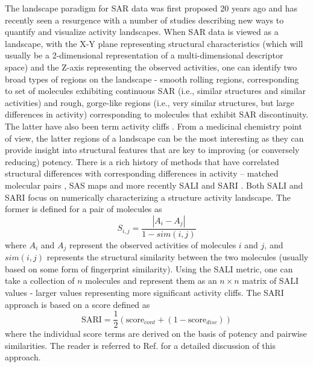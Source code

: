 \documentclass[letterpaper, 12pt]{article}
\begin{document}
The landscape paradigm for SAR data was first proposed 20 years ago \cite{Johnson:1990ys} and has
recently seen a resurgence with a number of studies describing new ways to quantify and visualize
activity landscapes. When SAR data is viewed as a landscape, with the X-Y plane representing
structural characteristics (which will usually be a 2-dimensional representation of a
multi-dimensional descriptor space) and the Z-axis representing the observed activities, one can
identify two broad types of regions on the landscape - smooth rolling regions, corresponding to set
of molecules exhibiting continuous SAR (i.e., similar structures and similar activities) and rough,
gorge-like regions (i.e., very similar structures, but large differences in activity) corresponding
to molecules that exhibit SAR discontinuity. The latter have also been term activity cliffs
\cite{Maggiora:2006aa}. From a medicinal chemistry point of view, the latter regions of a landscape
can be the most interesting as they can provide insight into structural features that are key to
improving (or conversely reducing) potency. There is a rich history of methods that have correlated
structural differences with corresponding differences in activity -- matched molecular pairs
\cite{Leach:2006aa}, SAS maps \cite{Maggiora:2011kx} and more recently SALI \cite{Guha:2008aa} and
SARI \cite{Peltason:2007aa}. Both SALI and SARI focus on numerically characterizing a structure
activity landscape. The former is defined for a pair of molecules as
\begin{equation}
  \label{eq:1}
  S_{i,j} = \frac{|A_i - A_j|}{1 - sim(i,j)}
\end{equation}
where $A_i$ and $A_j$ represent the observed activities of molecules $i$ and $j$, and $sim(i,j)$
represents the structural similarity between the two molecules (usually based on some form of
fingerprint similarity). Using the SALI metric, one can take a collection of $n$ molecules and
represent them as an $n \times n$ matrix of SALI values - larger values representing more
significant activity cliffs. The SARI approach is based on a score defined as
\begin{equation}
  \label{eq:2}
  \mathrm{SARI} = \frac{1}{2} \left(\mathrm{score}_{cont} + (1 -
    \mathrm{score}_{disc}) \right)
\end{equation}
where the individual score terms are derived on the basis of potency and pairwise similarities. The
reader is referred to Ref.  for a detailed discussion of this approach.
\end{document}
